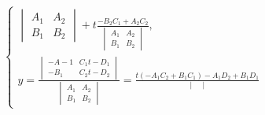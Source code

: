 \documentclass[a4paper]{article}
\begin{document}
\begin{hproof}
\begin{equation}
\begin{cases}
{\begin{vmatrix}
                                                                                                                                                                        A_1 & A_2 \\
                                                                                                                                                                        B_1 & B_2
                                                                                                               \end{vmatrix}} + t\frac{\displaystyle -B_2C_1+A_2C_2}{\begin{vmatrix}
                                                                                                                                                                         A_1 & A_2 \\
                                                                                                                                                                         B_1 & B_2
                                                                                                               \end{vmatrix}},
                                                                                                               \\
                                                                                                               y=\frac{\begin{vmatrix}
                                                                                                                           -A-1 & C_1t-D_1 \\
                                                                                                                           -B_1 & C_2t-D_2
                                                                                                               \end{vmatrix}}{\begin{vmatrix}
                                                                                                                                  A_1 & A_2 \\
                                                                                                                                  B_1 & B_2
                                                                                                               \end{vmatrix}} = \frac{\displaystyle t(-A_1C_2+B_1C_1) - A_1D_2+B_1D_1}{\begin{vmatrix}

\end{vmatrix}}
\end{cases}
\end{equation}
\end{hproof}
\end{document}

